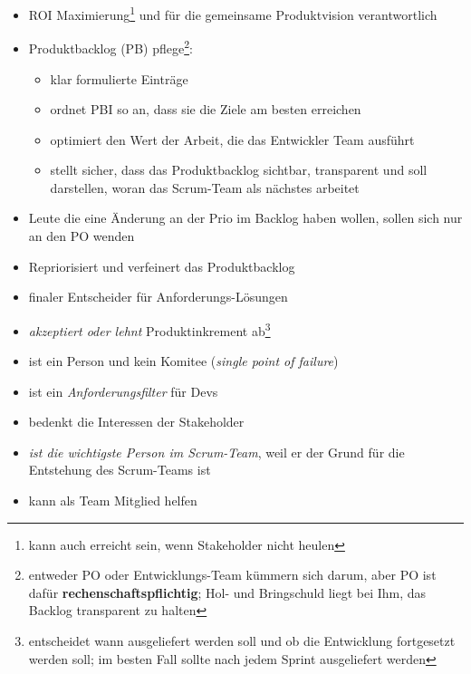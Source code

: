 \begin{itemize}
  \item ROI Maximierung\footnote{kann auch erreicht sein, wenn Stakeholder nicht heulen} und für die gemeinsame Produktvision verantwortlich
  \item Produktbacklog (PB) pflege\footnote{entweder PO oder Entwicklungs-Team kümmern sich darum, aber PO ist dafür \textbf{rechenschaftspflichtig}; Hol- und
      Bringschuld liegt bei Ihm, das Backlog transparent zu halten}:
    \begin{itemize}
      \item klar formulierte Einträge
      \item ordnet PBI so an, dass sie die Ziele am besten erreichen
      \item optimiert den Wert der Arbeit, die das Entwickler Team ausführt
      \item stellt sicher, dass das Produktbacklog sichtbar, transparent und soll darstellen, woran das Scrum-Team als nächstes arbeitet
    \end{itemize}
  \item Leute die eine Änderung an der Prio im Backlog haben wollen, sollen sich nur an den PO wenden
  \item Repriorisiert und verfeinert das Produktbacklog
  \item finaler Entscheider für Anforderungs-Lösungen
  \item \textit{akzeptiert oder lehnt} Produktinkrement ab\footnote{entscheidet wann ausgeliefert werden soll
      und ob die Entwicklung fortgesetzt werden soll; im besten Fall sollte nach jedem Sprint
      ausgeliefert werden}
  \item ist ein Person und kein Komitee (\textit{single point of failure})
  \item ist ein \textit{Anforderungsfilter} für Devs
  \item bedenkt die Interessen der Stakeholder
  \item \textit{ist die wichtigste Person im Scrum-Team}, weil er der Grund für die Entstehung des Scrum-Teams ist
  \item kann als Team Mitglied helfen
\end{itemize}


